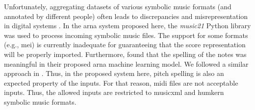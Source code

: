 
Unfortunately, aggregating datasets of various symbolic
music formats (and annotated by different people) often
leads to discrepancies and misrepresentation in digital
systems \parencite{napoleslopez2018encoding,
napoleslopez2019effects}. In the \gls{arna} system proposed
here, the \emph{music21} Python library
\parencite{cuthbert2010music21} was used to process incoming
symbolic music files. The support for some formats (e.g.,
\gls{mei}) is currently inadequate for guaranteeing that the
score representation will be properly imported. Furthermore,
\textcite{micchi2020not} found that the spelling of the
notes was meaningful in their proposed \gls{arna} machine
learning model. We followed a similar approach in
\textcite{napoleslopez2021augmentednet}. Thus, in the
proposed system here, pitch spelling is also an expected
property of the inputs. For that reason, \gls{midi} files
are not acceptable inputs. Thus, the allowed inputs are
restricted to \gls{musicxml} and \gls{humkern} symbolic
music formats.
